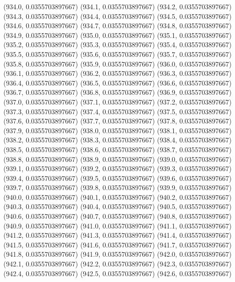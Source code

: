 {					(934.0, 0.0355703897667)
					(934.1, 0.0355703897667)
					(934.2, 0.0355703897667)
					(934.3, 0.0355703897667)
					(934.4, 0.0355703897667)
					(934.5, 0.0355703897667)
					(934.6, 0.0355703897667)
					(934.7, 0.0355703897667)
					(934.8, 0.0355703897667)
					(934.9, 0.0355703897667)
					(935.0, 0.0355703897667)
					(935.1, 0.0355703897667)
					(935.2, 0.0355703897667)
					(935.3, 0.0355703897667)
					(935.4, 0.0355703897667)
					(935.5, 0.0355703897667)
					(935.6, 0.0355703897667)
					(935.7, 0.0355703897667)
					(935.8, 0.0355703897667)
					(935.9, 0.0355703897667)
					(936.0, 0.0355703897667)
					(936.1, 0.0355703897667)
					(936.2, 0.0355703897667)
					(936.3, 0.0355703897667)
					(936.4, 0.0355703897667)
					(936.5, 0.0355703897667)
					(936.6, 0.0355703897667)
					(936.7, 0.0355703897667)
					(936.8, 0.0355703897667)
					(936.9, 0.0355703897667)
					(937.0, 0.0355703897667)
					(937.1, 0.0355703897667)
					(937.2, 0.0355703897667)
					(937.3, 0.0355703897667)
					(937.4, 0.0355703897667)
					(937.5, 0.0355703897667)
					(937.6, 0.0355703897667)
					(937.7, 0.0355703897667)
					(937.8, 0.0355703897667)
					(937.9, 0.0355703897667)
					(938.0, 0.0355703897667)
					(938.1, 0.0355703897667)
					(938.2, 0.0355703897667)
					(938.3, 0.0355703897667)
					(938.4, 0.0355703897667)
					(938.5, 0.0355703897667)
					(938.6, 0.0355703897667)
					(938.7, 0.0355703897667)
					(938.8, 0.0355703897667)
					(938.9, 0.0355703897667)
					(939.0, 0.0355703897667)
					(939.1, 0.0355703897667)
					(939.2, 0.0355703897667)
					(939.3, 0.0355703897667)
					(939.4, 0.0355703897667)
					(939.5, 0.0355703897667)
					(939.6, 0.0355703897667)
					(939.7, 0.0355703897667)
					(939.8, 0.0355703897667)
					(939.9, 0.0355703897667)
					(940.0, 0.0355703897667)
					(940.1, 0.0355703897667)
					(940.2, 0.0355703897667)
					(940.3, 0.0355703897667)
					(940.4, 0.0355703897667)
					(940.5, 0.0355703897667)
					(940.6, 0.0355703897667)
					(940.7, 0.0355703897667)
					(940.8, 0.0355703897667)
					(940.9, 0.0355703897667)
					(941.0, 0.0355703897667)
					(941.1, 0.0355703897667)
					(941.2, 0.0355703897667)
					(941.3, 0.0355703897667)
					(941.4, 0.0355703897667)
					(941.5, 0.0355703897667)
					(941.6, 0.0355703897667)
					(941.7, 0.0355703897667)
					(941.8, 0.0355703897667)
					(941.9, 0.0355703897667)
					(942.0, 0.0355703897667)
					(942.1, 0.0355703897667)
					(942.2, 0.0355703897667)
					(942.3, 0.0355703897667)
					(942.4, 0.0355703897667)
					(942.5, 0.0355703897667)
					(942.6, 0.0355703897667)
}
